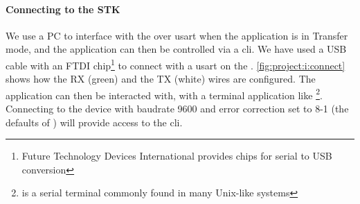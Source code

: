 

\paragraph{Connecting to the STK}

We use a PC to interface with the {\gecko} over \gls{usart} when the application is in Transfer mode, and the application can then be controlled via a \gls{cli}.
We have used a USB cable with an FTDI chip\footnote{Future Technology Devices International provides chips for serial to USB conversion} to connect with a \gls{usart} on the {\STK}.
\autoref{fig:project:i:connect} shows how the RX (green) and the TX (white) wires are configured.
The application can then be interacted with, with a terminal application like \footnote{ is a serial terminal commonly found in many Unix-like systems}.
Connecting to the device with baudrate 9600 and error correction set to 8-1 (the defaults of ) will provide access to the {\tracker} \gls{cli}.


